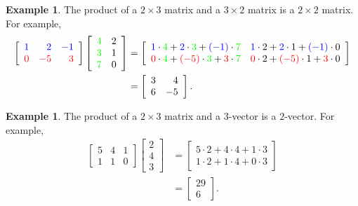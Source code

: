 \documentclass[12pt,letterpaper]{book}
\def\red{\textcolor{red}}
\def\green{\textcolor{green}}
\def\blue{\textcolor{blue}}
\numberwithin{equation}{section}
\theoremstyle{definition}
\newtheorem{example}[thm]{\textbf{Example}}
\begin{document}
\begin{example} The product of a $2\times 3$ matrix and a $3\times 2$ matrix is a $2\times 2$ matrix. For example,
\begin{align*} \left[\begin{array}{rrr} \blue{1} & \blue{2} & \blue{-1} \\
\red{0} & \red{-5} & \red{3}
\end{array}\right]\left[\begin{array}{rr} \green{4} & 2 \\ \green{3} & 1 \\ \green{7} & 0
\end{array}\right]&=\left[\begin{array}{rr} \blue{1}\cdot \green{4}+\blue{2}\cdot \green{3} +\blue{(-1)}\cdot \green{7} & \blue{1}\cdot 2 +\blue{2}\cdot 1 +\blue{(-1)}\cdot 0 \\ \red{0}\cdot \green{4} +\red{(-5)}\cdot \green{3} +\red{3}\cdot \green{7} & \red{0}\cdot 2 +\red{(-5)}\cdot 1 + \red{3}\cdot 0
\end{array}\right]\\&=\left[\begin{array}{rr} 3 & 4 \\ 6 & -5
\end{array}\right].
\end{align*}
\end{example}

\begin{example} The product of a $2\times 3$ matrix and a $3$-vector is a $2$-vector. For example,
\begin{align*}\left[\begin{array}{rrr} 5 & 4 & 1 \\ 1 & 1 & 0
\end{array}\right]\left[\begin{array}{r} 2 \\ 4 \\ 3
\end{array}\right]&=\left[\begin{array}{r} 5\cdot 2 +4\cdot 4 +1\cdot 3  \\ 1\cdot 2 + 1\cdot 4 +0\cdot 3 \end{array}\right]\\
&=\left[\begin{array}{c} 29 \\ 6
\end{array}\right].\end{align*}
\end{example}
\end{document}
